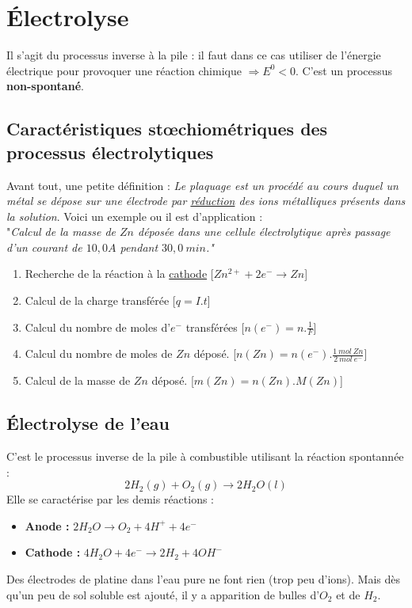 \documentclass	[11pt, a4paper, openany]{book}
\begin{document}
\section{Électrolyse}
Il s'agit du processus inverse à la pile : il faut dans ce cas utiliser de l'énergie électrique pour provoquer une réaction chimique $\Rightarrow E^0 <0$. C'est un processus \textbf{non-spontané}.

\subsection*{Caractéristiques stœchiométriques des processus électrolytiques}
Avant tout, une petite définition : \textit{Le plaquage est un procédé au cours duquel un métal se dépose sur une électrode par \underline{réduction} des ions métalliques présents dans la solution}. Voici un exemple ou il est d'application :\\

"\textit{Calcul de la masse de $Zn$ déposée dans une cellule électrolytique après passage d'un courant de $10,0A$ pendant $30,0\ min$."}
\begin{enumerate}
	\item Recherche de la réaction à la \underline{cathode} [$Zn^{2+} + 2e^- \rightarrow Zn$]
	\item Calcul de la charge transférée [$q = I.t$]
	\item Calcul du nombre de moles d'$e^-$ transférées [$n(e^-) = n.\frac{1}{F} $]
	\item Calcul du nombre de moles de $Zn$ déposé. [$n(Zn) = n(e^-).\frac{1\ mol\ Zn}{2\ mol\ e^-}$]
	\item Calcul de la masse de $Zn$ déposé. [$m(Zn) = n(Zn).M(Zn)$]
\end{enumerate}

\subsection{Électrolyse de l'eau}
C'est le processus inverse de la pile à combustible utilisant la réaction spontannée : 
$$2H_2 (g) + O_2 (g) \rightarrow 2 H_2O (l)$$
Elle se caractérise par les demis réactions :
\begin{itemize}
	\item \textbf{Anode :} $2H_2O \rightarrow O_2 + 4H^+ + 4e^-$
	\item \textbf{Cathode :} $4 H_2O + 4e^- \rightarrow 2 H_2 + 4 OH^-$
\end{itemize}
Des électrodes de platine dans l'eau pure ne font rien (trop peu d'ions). Mais dès qu'un peu de sol soluble est ajouté, il y a apparition de bulles d'$O_2$ et de $H_2$.\\
\end{document}
